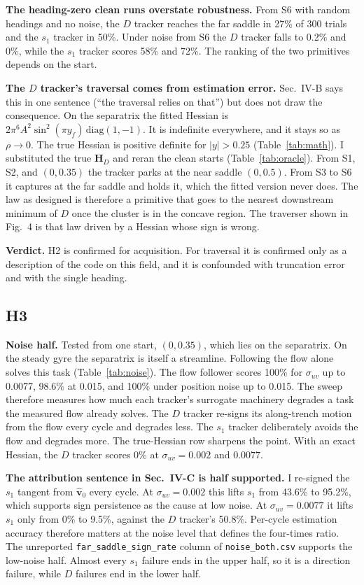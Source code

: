 \documentclass[10.5pt]{article}
\begin{document}
\textbf{The heading-zero clean runs overstate robustness.} From S6 with random headings and no noise, the $D$ tracker reaches the far saddle in 27\% of 300 trials and the $s_1$ tracker in 50\%. Under noise from S6 the $D$ tracker falls to 0.2\% and 0\%, while the $s_1$ tracker scores 58\% and 72\%. The ranking of the two primitives depends on the start.

\textbf{The $D$ tracker's traversal comes from estimation error.} Sec.~IV-B says this in one sentence (``the traversal relies on that'') but does not draw the consequence. On the separatrix the fitted Hessian is $2\pi^6A^2\sin^2(\pi y_f)\,\mathrm{diag}(1,-1)$. It is indefinite everywhere, and it stays so as $\rho\to0$. The true Hessian is positive definite for $|y|>0.25$ (Table~\ref{tab:math}). I substituted the true $\mathbf{H}_D$ and reran the clean starts (Table~\ref{tab:oracle}). From S1, S2, and $(0,0.35)$ the tracker parks at the near saddle $(0,0.5)$. From S3 to S6 it captures at the far saddle and holds it, which the fitted version never does. The law as designed is therefore a primitive that goes to the nearest downstream minimum of $D$ once the cluster is in the concave region. The traverser shown in Fig.~4 is that law driven by a Hessian whose sign is wrong.

\textbf{Verdict.} H2 is confirmed for acquisition. For traversal it is confirmed only as a description of the code on this field, and it is confounded with truncation error and with the single heading.

\subsection{H3}
\textbf{Noise half.} Tested from one start, $(0,0.35)$, which lies on the separatrix. On the steady gyre the separatrix is itself a streamline. Following the flow alone solves this task (Table~\ref{tab:noise}). The flow follower scores 100\% for $\sigma_{uv}$ up to 0.0077, 98.6\% at 0.015, and 100\% under position noise up to 0.015. The sweep therefore measures how much each tracker's surrogate machinery degrades a task the measured flow already solves. The $D$ tracker re-signs its along-trench motion from the flow every cycle and degrades less. The $s_1$ tracker deliberately avoids the flow and degrades more. The true-Hessian row sharpens the point. With an exact Hessian, the $D$ tracker scores 0\% at $\sigma_{uv}=0.002$ and $0.0077$.

\textbf{The attribution sentence in Sec.~IV-C is half supported.} I re-signed the $s_1$ tangent from $\hat{\mathbf v}_0$ every cycle. At $\sigma_{uv}=0.002$ this lifts $s_1$ from 43.6\% to 95.2\%, which supports sign persistence as the cause at low noise. At $\sigma_{uv}=0.0077$ it lifts $s_1$ only from 0\% to 9.5\%, against the $D$ tracker's 50.8\%. Per-cycle estimation accuracy therefore matters at the noise level that defines the four-times ratio. The unreported \texttt{far\_saddle\_sign\_rate} column of \texttt{noise\_both.csv} supports the low-noise half. Almost every $s_1$ failure ends in the upper half, so it is a direction failure, while $D$ failures end in the lower half.
\end{document}

